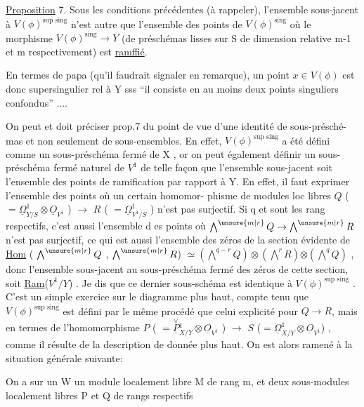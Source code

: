 
\uline{Proposition} 7. Sous les conditions précédentes (à rappeler), l'ensemble
sous-jacent à $V(\phi)^{\text{sup sing}}$ n'est autre que l'ensemble des points de
$V(\phi)^{\text{sing}}$  où le morphisme $V(\phi)^{\text{sing}}\longrightarrow Y$ (de préschémas lisses
sur S de dimension relative m-1 et m respectivement) est \uline{ramffié}.

En termes de papa (qu'il faudrait signaler en remarque), un point
$x \in V(\phi)$ est donc supersingulier rel à Y sss ``il consiste en au
moins deux points singuliers confondus'' ....

On peut et doit préciser prop.7 du point de vue d'une identité de  sous-présché-%
mas et non seulement de sous-ensembles. En effet, $V(\phi)^{\text{sup sing}}$ a été
défini comme un sous-préschéma fermé de X , or on peut également définir
un sous-préschéma fermé naturel de $V^1$ de telle façon que l'ensemble
sous-jacent soit l'ensemble des points de ramification par rapport à Y.
En effet, il faut exprimer l'ensemble des points où un certain homomor-%
phisme de modules loc libres $Q$ ( $=\underline{\Omega}^1_{Y/S}\otimes\underline{O}_{V^1}$ ) $\longrightarrow$ $R$ ( $=\underline{\Omega}^1_{V^1/S}$ )
n'est pas surjectif. Si q et  sont les rang respectifs, c'est aussi
l'ensemble d es points où $\bigwedge^{\unsure{m|r}} Q \rightarrow \bigwedge^{\unsure{m|r}} R$ n'est pas surjectif, ce qui est
aussi l'ensemble des zéros de la section évidente de \uline{Hom} ( $\bigwedge^{\unsure{m|r}} Q$ , $\bigwedge^{\unsure{m|r}} R$)
$\simeq (\bigwedge^{q-r} Q)\otimes(\bigwedge^{r} R)$$\otimes(\bigwedge^{q} Q)$\hand{$^{\vee}$} , donc l'ensemble sous-jacent au sous-préschéma
fermé des zéros de cette section, soit \uline{Ram}($V^1/Y$) . Je dis que ce dernier
sous-schéma est identique à $V(\phi)^{\text{sup sing}}$ . C'est un simple exercice
sur le diagramme plus haut, compte tenu que $V(\phi)^{\text{sup sing}}$ est défini
par le même procédé que celui explicité pour $Q\longrightarrow R$, mais en termes de
l'homomorphisme $P$ ( $= \overset{\vee}{\underline{P}}{}^1_{X/Y}\otimes\underline{O}_{V^1}$ ) $\longrightarrow$ $S$ ($=\underline{\Omega}^1_{X/Y}\otimes\underline{O}_{V^1}$) , comme
il résulte de la description de \hand{$\mu$} donnée plus haut. On est alors
ramené à la situation générale suivante:

On a sur un   W un module localement libre M de rang m,
et deux sous-modules localement libres P et Q de rangs respectifs

